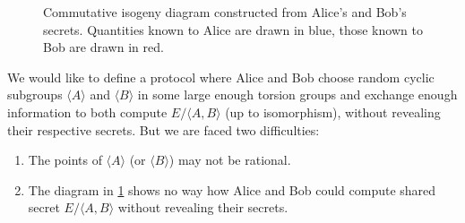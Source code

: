 \documentclass{article}
\theoremstyle{theorem}
\theoremstyle{definition}
\begin{document}
\begin{figure}
	\centering
\caption{Commutative isogeny diagram constructed from Alice's and
	Bob's secrets. Quantities known to Alice are drawn in blue, those known to Bob are drawn in red.} \label{SIDH-diagram:figure}
\end{figure}

We would like to define a protocol where Alice and Bob choose random cyclic subgroups $\langle A \rangle$ and $\langle B \rangle$ in some large enough torsion groups and exchange enough information to both compute $E/ \langle A, B \rangle$ (up to isomorphism), without revealing their respective secrets. But we are faced two difficulties:

	\begin{enumerate}
		\item The points of $\langle A \rangle$ (or $\langle B \rangle$) may not be rational.
		
		\item The diagram in \cref{SIDH-diagram:figure} shows no way how Alice and Bob could compute shared secret $E/\langle A, B \rangle$ without revealing their secrets.
	\end{enumerate}
\end{document}
